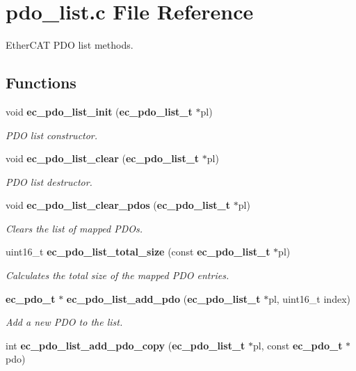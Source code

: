 \section{pdo\-\_\-list.\-c \-File \-Reference}
\label{pdo__list_8c}


\-Ether\-C\-A\-T \-P\-D\-O list methods.  


\subsection*{\-Functions}
\begin{DoxyCompactItemize}
\item 
void {\bf ec\-\_\-pdo\-\_\-list\-\_\-init} ({\bf ec\-\_\-pdo\-\_\-list\-\_\-t} $\ast$pl)
\begin{DoxyCompactList}\small\item\em \-P\-D\-O list constructor. \end{DoxyCompactList}\item 
void {\bf ec\-\_\-pdo\-\_\-list\-\_\-clear} ({\bf ec\-\_\-pdo\-\_\-list\-\_\-t} $\ast$pl)
\begin{DoxyCompactList}\small\item\em \-P\-D\-O list destructor. \end{DoxyCompactList}\item 
void {\bf ec\-\_\-pdo\-\_\-list\-\_\-clear\-\_\-pdos} ({\bf ec\-\_\-pdo\-\_\-list\-\_\-t} $\ast$pl)
\begin{DoxyCompactList}\small\item\em \-Clears the list of mapped \-P\-D\-Os. \end{DoxyCompactList}\item 
uint16\-\_\-t {\bf ec\-\_\-pdo\-\_\-list\-\_\-total\-\_\-size} (const {\bf ec\-\_\-pdo\-\_\-list\-\_\-t} $\ast$pl)
\begin{DoxyCompactList}\small\item\em \-Calculates the total size of the mapped \-P\-D\-O entries. \end{DoxyCompactList}\item 
{\bf ec\-\_\-pdo\-\_\-t} $\ast$ {\bf ec\-\_\-pdo\-\_\-list\-\_\-add\-\_\-pdo} ({\bf ec\-\_\-pdo\-\_\-list\-\_\-t} $\ast$pl, uint16\-\_\-t index)
\begin{DoxyCompactList}\small\item\em \-Add a new \-P\-D\-O to the list. \end{DoxyCompactList}\item 
int {\bf ec\-\_\-pdo\-\_\-list\-\_\-add\-\_\-pdo\-\_\-copy} ({\bf ec\-\_\-pdo\-\_\-list\-\_\-t} $\ast$pl, const {\bf ec\-\_\-pdo\-\_\-t} $\ast$pdo)

\end{DoxyCompactItemize}
